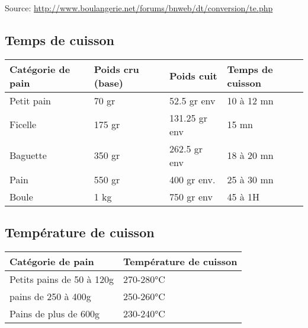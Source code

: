 \documentclass[a4paper,twoside,openright]{report}
\begin{document}
Source: \url{http://www.boulangerie.net/forums/bnweb/dt/conversion/te.php}

\subsection{Temps de cuisson}
\begin{center}
\begin{tabular}{|l|l|l|l|}\hline
Catégorie de pain & Poids cru (base) & Poids cuit     &  Temps de cuisson \\\hline
Petit pain        & 70 gr            & 52.5 gr env    &  10 à 12 mn       \\\hline
Ficelle           & 175 gr           & 131.25 gr env  &  15 mn            \\\hline
Baguette          & 350 gr           & 262.5 gr env   &  18 à 20 mn       \\\hline
Pain              & 550 gr           & 400 gr env.    &  25 à 30 mn       \\\hline
Boule             & 1 kg             & 750 gr env     &  45 à 1H          \\\hline
\end{tabular}\end{center}

\subsection{Température de cuisson}
\begin{center}
\begin{tabular}{|l|l|}\hline
Catégorie de pain & Température de cuisson \\\hline
Petits pains de 50 à 120g & 270-280°C \\\hline
pains de 250 à 400g & 250-260°C \\\hline
Pains de plus de 600g & 230-240°C \\\hline
\end{tabular}\end{center}
\end{document}
